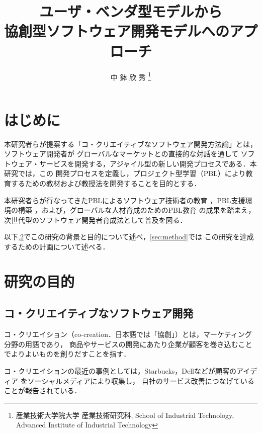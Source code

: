 \documentclass[a4j,9pt,twoside,twocolumn]{jsarticle}
\title{ユーザ・ベンダ型モデルから\\協創型ソフトウェア開発モデルへのアプローチ}
\author{
中 鉢 欣 秀
\thanks{産業技術大学院大学 産業技術研究科, School of Industrial Technology, Advanced Institute of Industrial Technology}
}
\begin{document}
\pagestyle{empty}
\maketitle\thispagestyle{empty} %
\makereceivedon %

\section{はじめに}

	本研究者らが提案する「コ・クリエイティブなソフトウェア開発方法論」とは，ソフトウェア開発者が
	グローバルなマーケットとの直接的な対話を通して
	ソフトウェア・サービスを開発する，アジャイル型の新しい開発プロセスである．本研究では，この
	開発プロセスを定義し，プロジェクト型学習（PBL）により教育するための教材および教授法を開発することを目的とする．
	
	本研究者らが行なってきたPBLによるソフトウェア技術者の教育
	\cite{pub:tozawa-pbl-2009}\cite{pub:matsuzawa-2008}
	，PBL支援環境の構築
	\cite{pub:chubachi-ipbl-2012}\cite{pub:chubachi-ipbl-2011}
	\cite{pub:chubachi-ipbl-2009b}\cite{pub:chubachi-ipbl-2009a}
	，および，グローバルな人材育成のためのPBL教育
	\cite{pub:chubachi-global-2010}\cite{pub:nishino-2010}
	の成果を踏まえ，
	次世代型のソフトウェア開発者育成法として普及を図る．
	
	以下,\ref{sec:purpose}でこの研究の背景と目的について述べ，\ref{sec:method}では
	この研究を達成するための計画について述べる．
	
\section{研究の目的}\label{sec:purpose}
\subsection{コ・クリエイティブなソフトウェア開発}

    コ・クリエイション（co-creation．日本語では「協創」）とは，マーケティング分野の用語であり，
    商品やサービスの開発にあたり企業が顧客を巻き込むことでよりよいものを創りだすことを指す．
    
    コ・クリエイションの最近の事例としては，Starbucks，Dellなどが顧客のアイディア
    をソーシャルメディアにより収集し，
    自社のサービス改善につなげていることが報告されている\cite{wired}．
\end{document}
